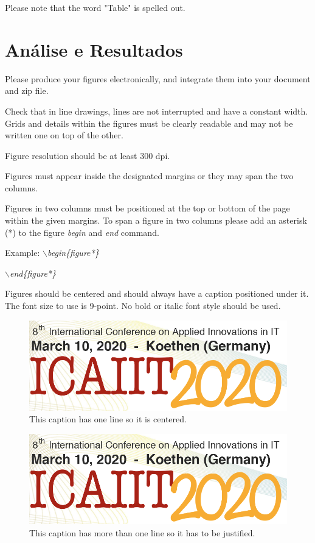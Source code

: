 \documentclass[a4paper,twoside]{article}
\begin{document}
Please note that the word "Table" is spelled out.

\section*{Análise e Resultados}

Please produce your figures electronically, and integrate them into
your document and zip file.

Check that in line drawings, lines are not interrupted and have a
constant width. Grids and details within the figures must be clearly
readable and may not be written one on top of the other.

Figure resolution should be at least 300 dpi.

Figures must appear inside the designated margins or they may span
the two columns.

Figures in two columns must be positioned at the top or bottom of
the page within the given margins. To span a figure in two columns please add an asterisk (*) to the figure \textit{begin} and \textit{end} command.

Example: \textit{$\backslash$begin\{figure*\}}

\hspace*{1.5cm}\textit{$\backslash$end\{figure*\}}

Figures should be centered and should always have a caption
positioned under it. The font size to use is 9-point. No bold or
italic font style should be used.

\begin{figure}[!h]
  \centering
   \includegraphics[width=5.5 cm]{ICAIIT.png}
  \caption{This caption has one line so it is centered.}
  \label{fig:example1}
 \end{figure}

\begin{figure}[!h]
  \vspace{-0.2cm}
  \centering
   \includegraphics[width=5.5 cm]{ICAIIT.png}
  \caption{This caption has more than one line so it has to be justified.}
  \label{fig:example2}
  \vspace{-0.1cm}
\end{figure}
\end{document}
